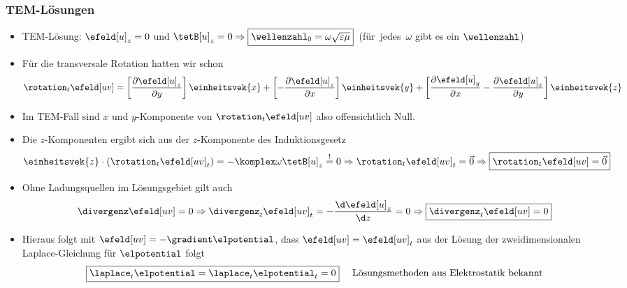 \begin{frame}
\frametitle{TEM-Lösungen}
     \begin{itemize}[<+->]
     \item TEM-Lösung: \(\efeld[u]_z = 0\) und \(\tetB[u]_z=0 \Rightarrow \boxed{\wellenzahl_0 = \omega \sqrt{\varepsilon\mu}}\)~(für~\alert{jedes}~\(\omega\) gibt es ein \(\wellenzahl\)) 
    \item Für die transversale Rotation hatten wir schon
      \begin{equation*}
      \rotation_t \efeld[uv] =  \left[ \frac{\partial \efeld[u]_z}{\partial y} \right] \einheitsvek{x} + \left[ - \frac{\partial \efeld[u]_{z}}{\partial x} \right] \einheitsvek{y } + \left[ \frac{\partial \efeld[u]_{y}}{\partial x} - \frac{\partial \efeld[u]_{x}}{\partial y}\right] \einheitsvek{z}
    \end{equation*}
  \item Im TEM-Fall sind \alert{\(x\) und \(y\)-Komponente} von \(\rotation_t \efeld[uv]\) also \alert{offensichtlich Null}.
  \item Die \alert{\(z\)-Komponenten} ergibt sich aus der \(z\)-Komponente des Induktionsgesetz
     \begin{equation*}
        \einheitsvek{z} \cdot \left(\rotation_t \efeld[uv]_t\right) = -\komplex\omega\tetB[u]_z  \stackrel{!}{=} 0 \Rightarrow
        \rotation_t \efeld[uv]_t = \vec{0} \Rightarrow \boxed{\rotation_t \efeld[uv] = \vec{0}} 
      \end{equation*}
    \item Ohne Ladungsquellen im Lösungsgebiet gilt auch
      \begin{equation*}
     \divergenz\efeld[uv] = 0 \Rightarrow \divergenz_t\efeld[uv]_t = -\frac{\d \efeld[u]_z}{\d z} = 0 \Rightarrow  \boxed{\divergenz_t\efeld[uv]=0}
     \end{equation*}
    \item Hieraus folgt mit \(\efeld[uv] = -\gradient\elpotential\), dass \(\efeld[uv] = \efeld[uv]_t\) aus der \alert{Lösung der zweidimensionalen Laplace-Gleichung} für \(\elpotential\) folgt
      \begin{equation*}
        \boxed{\laplace_t \elpotential = \laplace_t \elpotential_t = 0} \quad \text{ Lösungsmethoden aus Elektrostatik bekannt}
       \end{equation*}
     \end{itemize}
\end{frame}

